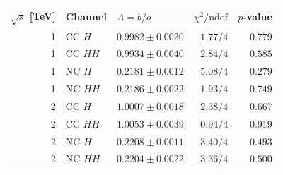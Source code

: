 \documentclass[10pt,a4paper]{article}
\newcommand{\sqrts}{\sqrt{s}}
\begin{document}
\begin{center}
\small
\begin{tabular}{rllrr}\toprule
$\sqrts$ [TeV] & Channel & $A=b/a$ & $\chi^2/\mathrm{ndof}$ & $p$-value\\\midrule
1 & CC $H$ & $0.9982\pm0.0020$ & $1.77/4$ & $0.779$ \\
1 & CC $HH$ & $0.9934\pm0.0040$ & $2.84/4$ & $0.585$ \\
1 & NC $H$ & $0.2181\pm0.0012$ & $5.08/4$ & $0.279$ \\
1 & NC $HH$ & $0.2186\pm0.0022$ & $1.93/4$ & $0.749$ \\
2 & CC $H$ & $1.0007\pm0.0018$ & $2.38/4$ & $0.667$ \\
2 & CC $HH$ & $1.0053\pm0.0039$ & $0.94/4$ & $0.919$ \\
2 & NC $H$ & $0.2208\pm0.0011$ & $3.40/4$ & $0.493$ \\
2 & NC $HH$ & $0.2204\pm0.0022$ & $3.36/4$ & $0.500$ \\
\bottomrule\end{tabular}
\end{center}
\end{document}
